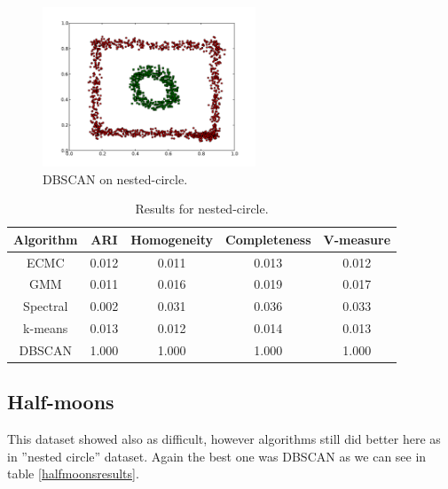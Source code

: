 \documentclass[conference]{IEEEtran}
\begin{document}
\begin{figure}[th]
\centering
\includegraphics[width=15pc]{dbscan_circle-weird.pdf}
\caption{DBSCAN on nested-circle.}
\label{DBSCAN_circleweird}
\end{figure}

\begin{table}[htbp]
\caption{Results for nested-circle.}
\label{circleweirdresults}
\begin{center}
\setlength{\tabcolsep}{3pt}
\begin{tabular}{ |c|c|c|c|c| }
\hline
	Algorithm & ARI & Homogeneity & Completeness & V-measure\\ \hline
	
	ECMC & 0.012 & 0.011 & 0.013 & 0.012 \\ \hline
	GMM & 0.011 & 0.016 & 0.019 & 0.017 \\ \hline
	Spectral & 0.002 & 0.031 & 0.036 & 0.033 \\ \hline
	k-means & 0.013 & 0.012 & 0.014 & 0.013 \\ \hline
	DBSCAN & 1.000 & 1.000 & 1.000 & 1.000 \\ \hline
\end{tabular}
\end{center}
\end{table}


\subsection{Half-moons}

This dataset showed also as difficult, however algorithms still did better here as in ''nested circle'' dataset. Again
the best one was DBSCAN as we can see in table \ref{halfmoonsresults}. 
\end{document}
